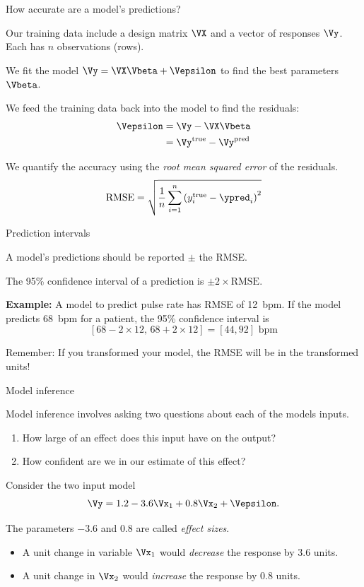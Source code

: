 \documentclass{beamer}
\begin{document}
\begin{frame}{How accurate are a model's predictions?}

\pause
Our training data include a design matrix $\VX$ and a vector of responses $\Vy$. Each has $n$ observations (rows).

\pause
\medskip
We fit the model $\Vy = \VX\Vbeta + \Vepsilon$ to find the best parameters $\Vbeta$.

\pause
\medskip
We feed the training data back into the model to find the residuals: 
\begin{align*}
	\Vepsilon &= \Vy - \VX\Vbeta \\
		&= \Vy^\text{true} - \Vy^\text{pred}
\end{align*}

\pause
\medskip
We quantify the accuracy using the \emph{root mean squared error} of the residuals.
\[ \text{RMSE} = \sqrt{\frac{1}{n}\sum_{i=1}^n\left( y^\text{true}_i - \ypred_i \right)^2} \]
	
\end{frame}

\begin{frame}{Prediction intervals}

A model's predictions should be reported $\pm$ the RMSE.

\pause
\medskip
The 95\% confidence interval of a prediction is $\pm 2\times\text{RMSE}$.

\pause
\medskip
\textbf{Example:} A model to predict pulse rate has RMSE of 12~bpm. If the model predicts 68~bpm for a patient, the 95\% confidence interval is
\[ [68-2\times12,\, 68+2\times12] = [44,92]\,\,\text{bpm} \]

\pause
\medskip
Remember: If you transformed your model, the RMSE will be in the transformed units!

\end{frame}

\begin{frame}{Model inference}

Model inference involves asking two questions about each of the models inputs.
\begin{enumerate}
	\item How large of an effect does this input have on the output?
	\item How confident are we in our estimate of this effect?
\end{enumerate}

\medskip
\pause
Consider the two input model
\[ \Vy = 1.2 - 3.6\Vx_1 + 0.8\Vx_2 + \Vepsilon. \]

\pause
The parameters $-3.6$ and $0.8$ are called \emph{effect sizes}.

\medskip
\pause
\begin{itemize}
	\item A unit change in variable $\Vx_1$ would \emph{decrease} the response by 3.6 units. 
	\item A unit change in $\Vx_2$ would \emph{increase} the response by 0.8 units.
\end{itemize}

\end{frame}
\end{document}
